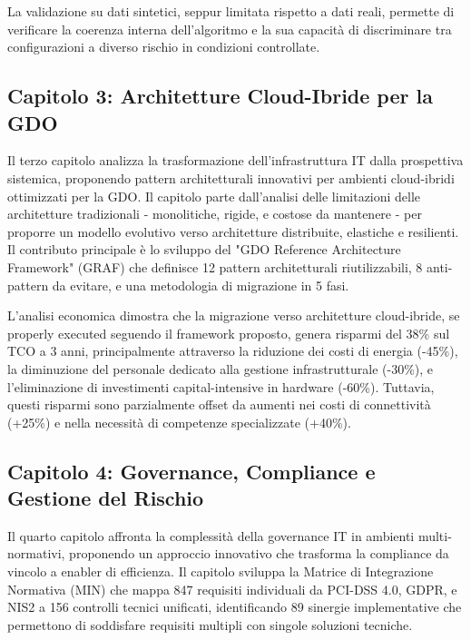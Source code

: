 \begin{tcolorbox}[title={Nota Metodologica}, colback=yellow!10]
La validazione su dati sintetici, seppur limitata rispetto a dati reali, 
permette di verificare la coerenza interna dell'algoritmo e la sua 
capacità di discriminare tra configurazioni a diverso rischio in 
condizioni controllate.
\end{tcolorbox}

\subsection{Capitolo 3: Architetture Cloud-Ibride per la GDO}

Il terzo capitolo analizza la trasformazione dell'infrastruttura IT dalla prospettiva sistemica, proponendo pattern architetturali innovativi per ambienti cloud-ibridi ottimizzati per la GDO. Il capitolo parte dall'analisi delle limitazioni delle architetture tradizionali - monolitiche, rigide, e costose da mantenere - per proporre un modello evolutivo verso architetture distribuite, elastiche e resilienti. Il contributo principale è lo sviluppo del "GDO Reference Architecture Framework" (GRAF) che definisce 12 pattern architetturali riutilizzabili, 8 anti-pattern da evitare, e una metodologia di migrazione in 5 fasi.

L'analisi economica dimostra che la migrazione verso architetture cloud-ibride, se properly executed seguendo il framework proposto, genera risparmi del 38\% sul TCO a 3 anni, principalmente attraverso la riduzione dei costi di energia (-45\%), la diminuzione del personale dedicato alla gestione infrastrutturale (-30\%), e l'eliminazione di investimenti capital-intensive in hardware (-60\%). Tuttavia, questi risparmi sono parzialmente offset da aumenti nei costi di connettività (+25\%) e nella necessità di competenze specializzate (+40\%).

\subsection{Capitolo 4: Governance, Compliance e Gestione del Rischio}

Il quarto capitolo affronta la complessità della governance IT in ambienti multi-normativi, proponendo un approccio innovativo che trasforma la compliance da vincolo a enabler di efficienza. Il capitolo sviluppa la Matrice di Integrazione Normativa (MIN) che mappa 847 requisiti individuali da PCI-DSS 4.0, GDPR, e NIS2 a 156 controlli tecnici unificati, identificando 89 sinergie implementative che permettono di soddisfare requisiti multipli con singole soluzioni tecniche.

